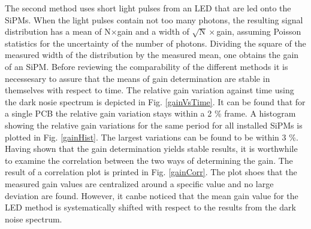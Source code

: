 The second method uses short light pulses from an LED that are led onto the SiPMs. When the light pulses contain not too many photons, the resulting signal distribution has a mean of N$\times$gain and a width of $\sqrt{\text{N}}\times$gain, assuming Poisson statistics for the uncertainty of the number of photons. Dividing the square of the measured width of the distribution by the measured mean, one obtains the gain of an SiPM.
Before reviewing the comparability of the different methods it is necessesary to assure that the means of gain determination are stable in themselves with respect to time. The relative gain variation against time using the dark nosie spectrum is depicted in Fig. \ref{gainVsTime}. It can be found that for a single PCB the relative gain variation stays within a 2 \% frame. A histogram showing the relative gain variations for the same period for all installed SiPMs is plotted in Fig. \ref{gainHist}. The largest variations can be found to be within 3 \%. Having shown that the gain determination yields stable results, it is worthwhile to examine the correlation between the two ways of determining the gain. The result of a correlation plot is printed in Fig. \ref{gainCorr}. The plot shoes that the measured gain values are centralized around a specific value and no large deviation are found. However, it canbe noticed that the mean gain value for the LED method is systematically shifted with respect to the results from the dark noise spectrum. 

